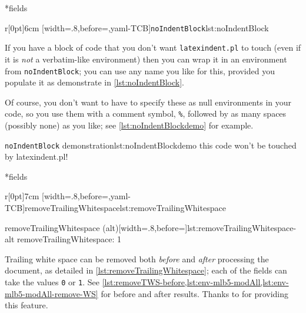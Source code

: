 *{fields}

	\begin{wrapfigure}[8]{r}[0pt]{6cm}
		[width=.8\linewidth,before=\centering,yaml-TCB]{\texttt{noIndentBlock}}{lst:noIndentBlock}
	\end{wrapfigure}
	If you have a block of code that you don't want \texttt{latexindent.pl} to touch (even if it is \emph{not} a verbatim-like
	environment) then you can wrap it in an environment from \texttt{noIndentBlock};
	you can use any name you like for this, provided you populate it as demonstrate in
	\cref{lst:noIndentBlock}.

	Of course, you don't want to have to specify these as null environments
	in your code, so you use them with a comment symbol, \lstinline!%!, followed
	by as many spaces (possibly none) as you like; see \cref{lst:noIndentBlockdemo} for
	example.

	\begin{cmhlistings}[style=demo,escapeinside={(*@}{@*)}]{\texttt{noIndentBlock} demonstration}{lst:noIndentBlockdemo}
        this code
                won't
     be touched
                    by
             latexindent.pl!
	\end{cmhlistings}

*{fields}\label{yaml:removeTrailingWhitespace}

	\begin{wrapfigure}[10]{r}[0pt]{7cm}
		[width=.8\linewidth,before=\centering,yaml-TCB]{removeTrailingWhitespace}{lst:removeTrailingWhitespace}

		\vspace{.1cm}
		\begin{yaml}[numbers=none]{removeTrailingWhitespace (alt)}[width=.8\linewidth,before=\centering]{lst:removeTrailingWhitespace-alt}
removeTrailingWhitespace: 1
\end{yaml}
	\end{wrapfigure}
	Trailing white space can be removed both \emph{before} and \emph{after} processing
	the document, as detailed in \cref{lst:removeTrailingWhitespace}; each of the fields
	can take the values \texttt{0} or \texttt{1}. See \vref{lst:removeTWS-before,lst:env-mlb5-modAll,lst:env-mlb5-modAll-remove-WS}
	for before and after results.  Thanks to \cite{vosskuhle} for providing this feature.

